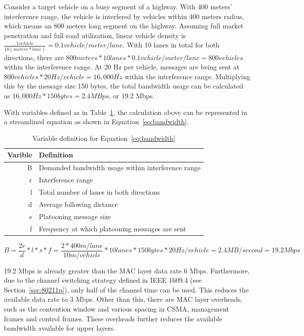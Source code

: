 \documentclass[12pt]{report}
\begin{document}
Consider a target vehicle on a busy segment of a highway. With 400 meters' interference range, the vehicle is interfered by vehicles within 400 meters radius, which means an 800 meters long segment on the highway. Assuming full market penetration and full road utilization, linear vehicle density is $\frac{1 vehicle}{10 (meters*lane)}=0.1 vehicle/meter/lane$. With 10 lanes in total for both directions, there are $800 meters * 10 lanes * 0.1 vehicle/meter/lane = 800 vehicles$ within the interference range. At 20 Hz per vehicle, messages are being sent at $800 vehicles * 20 Hz/vehicle=16,000 Hz$ within the interference range. Multiplying this by the message size 150 bytes, the total bandwidth usage can be calculated as $16,000 Hz * 150 bytes = 2.4 MBps$, or 19.2 Mbps.

With variables defined as in Table~\ref{tab:bandwidth_equation_variable}, the calculation above can be represented in a streamlined equation as shown in Equation~\ref{eq:bandwidth}.

\begin{table}[h]
  \begin{center}
    \begin{tabular}{r l}
      \hline
      Varible & Definition \\ \hline
      B & Demanded bandwidth usage within interference range \\
      r & Interference range \\
      l & Total number of lanes in both directions \\
      d & Average following distance \\
      s & Platooning message size \\
      f & Frequency at which platooning messages are sent \\ \hline
    \end{tabular}
    \caption{\label{tab:bandwidth_equation_variable}Variable definition for Equation~\ref{eq:bandwidth}}
  \end{center}
\end{table}

\begin{equation}
  B=\frac{2r}{d} * l * s * f = \frac{2 * 400m/lane}{10m/vehicle} * 10 lanes * 150 bytes * 20 Hz/vehicle = 2.4 MB/second = 19.2 Mbps
  \label{eq:bandwidth}
\end{equation}

19.2 Mbps is already greater than the MAC layer data rate 6 Mbps. Furthermore, due to the channel switching strategy defined in IEEE 1609.4 (see Section~\ref{sec:80211p}), only half of the channel time can be used. This reduces the available data rate to 3 Mbps. Other than this, there are MAC layer overheads, such as the contention window and various spacing in CSMA, management frames and control frames. These overheads further reduces the available bandwidth available for upper layers.
\end{document}
